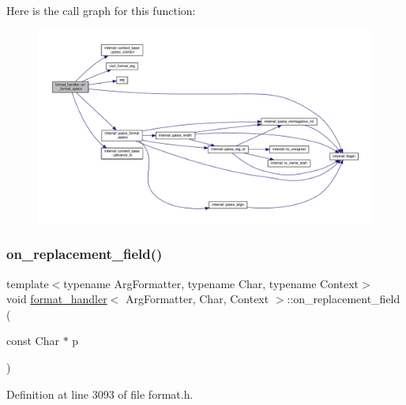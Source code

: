 Here is the call graph for this function\+:
\nopagebreak
\begin{figure}[H]
\begin{center}
\leavevmode
\includegraphics[width=350pt]{structformat__handler_a4d16ddae0958acb12d0606038c393b24_cgraph}
\end{center}
\end{figure}
\mbox{\label{structformat__handler_abe898802a15ef6686480569ab638b38a}} 
\subsubsection{\texorpdfstring{on\+\_\+replacement\+\_\+field()}{on\_replacement\_field()}}
{\footnotesize\ttfamily template$<$typename Arg\+Formatter, typename Char, typename Context$>$ \\
void \hyperlink{structformat__handler}{format\+\_\+handler}$<$ Arg\+Formatter, Char, Context $>$\+::on\+\_\+replacement\+\_\+field (\begin{DoxyParamCaption}\item[{const Char $\ast$}]{p }\end{DoxyParamCaption})\hspace{0.3cm}{\ttfamily [inline]}}



Definition at line 3093 of file format.\+h.


